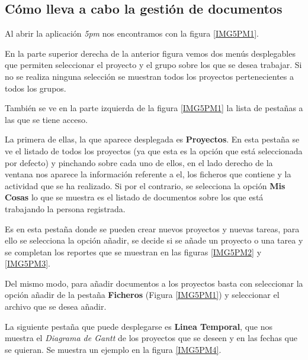 \documentclass[11pt,a4paper,spanish,twoside]{report}
\begin{document}
	\subsection{Cómo lleva a cabo la gestión de documentos}
        
        Al abrir la aplicación \emph{5pm} nos encontramos con la figura
        \ref{IMG5PM1}.
        

        En la parte superior derecha de la anterior figura vemos dos menús
        desplegables que permiten seleccionar el proyecto y el grupo sobre
        los que se desea trabajar. Si no se realiza ninguna selección se
        muestran todos los proyectos pertenecientes a todos los grupos.

        También se ve en la parte izquierda de la figura \ref{IMG5PM1} la
        lista de pestañas a las que se tiene acceso.

        La primera de ellas, la que aparece desplegada es
        \textbf{Proyectos}. En esta pestaña se ve el listado de todos los
        proyectos (ya que esta es la opción que está seleccionada por
        defecto) y pinchando sobre cada uno de ellos, en el lado derecho de
        la ventana nos aparece la información referente a el, los ficheros
        que contiene y la actividad que se ha realizado. Si por el contrario,
        se selecciona la opción \textbf{Mis Cosas} lo que se muestra es el
        listado de documentos sobre los que está trabajando la persona
        registrada.


        Es en esta pestaña donde se pueden crear nuevos proyectos y nuevas
        tareas, para ello se selecciona la opción añadir, se decide si se
        añade un proyecto o una tarea y se completan los reportes que se
        muestran en las figuras \ref{IMG5PM2} y \ref{IMG5PM3}.

    
      
        Del mismo modo, para añadir documentos a los proyectos basta con
        seleccionar la opción añadir de la pestaña \textbf{Ficheros} (Figura
        \ref{IMG5PM1}) y seleccionar el archivo que se desea añadir.

        La siguiente pestaña que puede desplegarse es \textbf{Linea
          Temporal}, que nos muestra el \emph{Diagrama de Gantt} de los
        proyectos que se deseen y en las fechas que se quieran. Se muestra un
        ejemplo en la figura \ref{IMG5PM4}.
\end{document}
